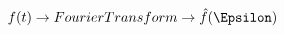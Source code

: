 \documentclass[preview]{standalone}
\begin{document}
\begin{align*}
f(t) \rightarrow Fourier Transform \rightarrow \hat{f}(\Epsilon)
\end{align*}
\end{document}
